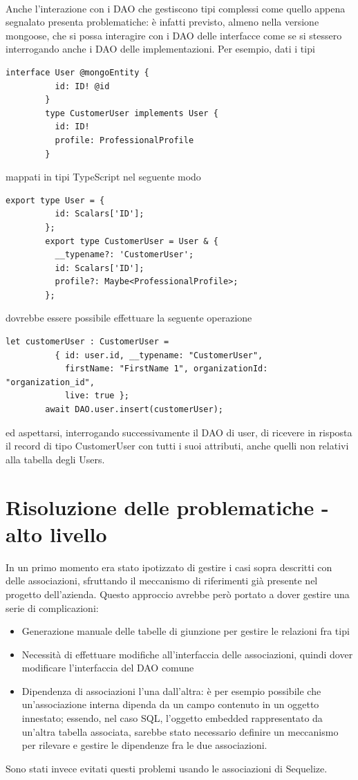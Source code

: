 \documentclass[a4paper, 12pt]{report}
\begin{document}
      \paragraph*{}
      Anche l'interazione con i DAO che gestiscono tipi complessi come quello appena segnalato presenta problematiche: è infatti previsto, almeno nella versione mongoose, che si possa interagire con i DAO delle interfacce come se si stessero interrogando anche i DAO delle implementazioni.
      Per esempio, dati i tipi
      \begin{Verbatim}[samepage=true]
        interface User @mongoEntity {
          id: ID! @id
        }
        type CustomerUser implements User {
          id: ID!
          profile: ProfessionalProfile
        }
      \end{Verbatim}
      mappati in tipi TypeScript nel seguente modo
      \begin{Verbatim}[samepage=true]
        export type User = {
          id: Scalars['ID'];
        };
        export type CustomerUser = User & {
          __typename?: 'CustomerUser';
          id: Scalars['ID'];
          profile?: Maybe<ProfessionalProfile>;
        };
      \end{Verbatim}
      dovrebbe essere possibile effettuare la seguente operazione
      \begin{Verbatim}[samepage=true]
        let customerUser : CustomerUser = 
          { id: user.id, __typename: "CustomerUser",
            firstName: "FirstName 1", organizationId: "organization_id",
            live: true };
        await DAO.user.insert(customerUser);
      \end{Verbatim}
      ed aspettarsi, interrogando successivamente il DAO di user, di ricevere in risposta il record di tipo CustomerUser con tutti i suoi attributi, anche quelli non relativi alla tabella degli Users.
    \newpage
    \section{Risoluzione delle problematiche - alto livello}
      In un primo momento era stato ipotizzato di gestire i casi sopra descritti con delle associazioni, sfruttando il meccanismo di riferimenti già presente nel progetto dell'azienda.
      Questo approccio avrebbe però portato a dover gestire una serie di complicazioni:
      \begin{itemize}
        \item Generazione manuale delle tabelle di giunzione per gestire le relazioni fra tipi
        \item Necessità di effettuare modifiche all'interfaccia delle associazioni, quindi dover modificare l'interfaccia del DAO comune
        \item Dipendenza di associazioni l'una dall'altra: è per esempio possibile che un'associazione interna dipenda da un campo contenuto in un oggetto innestato; essendo, nel caso SQL, l'oggetto embedded rappresentato da un'altra tabella associata, sarebbe stato necessario definire un meccanismo per rilevare e gestire le dipendenze fra le due associazioni.
      \end{itemize}
      Sono stati invece evitati questi problemi usando le associazioni di Sequelize.
\end{document}
